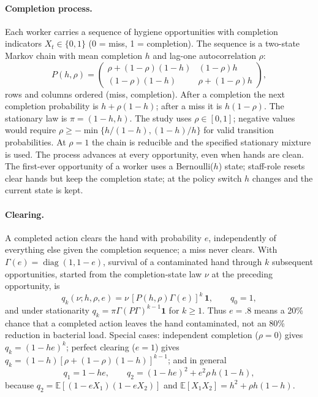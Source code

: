 \documentclass[11pt]{article}
\newcommand{\E}{\mathbb E}
\begin{document}
\paragraph{Completion process.} Each worker carries a sequence of hygiene
opportunities with completion indicators $X_t\in\{0,1\}$ (0 = miss, 1 =
completion). The sequence is a two-state Markov chain with mean completion $h$
and lag-one autocorrelation $\rho$:
\begin{equation}\label{eq:P}
P(h,\rho)=\begin{pmatrix}
\rho+(1-\rho)(1-h)&(1-\rho)h\\
(1-\rho)(1-h)&\rho+(1-\rho)h
\end{pmatrix},
\end{equation}
rows and columns ordered (miss, completion). After a completion the next
completion probability is $h+\rho(1-h)$; after a miss it is $h(1-\rho)$. The
stationary law is $\pi=(1-h,h)$. The study uses $\rho\in[0,1]$; negative values
would require $\rho\ge-\min\{h/(1-h),(1-h)/h\}$ for valid transition
probabilities. At $\rho=1$ the chain is reducible and the specified stationary
mixture is used. The process advances at every opportunity, even when hands are
clean. The first-ever opportunity of a worker uses a Bernoulli($h$) state;
staff-role resets clear hands but keep the completion state; at the policy
switch $h$ changes and the current state is kept.

\paragraph{Clearing.} A completed action clears the hand with probability $e$,
independently of everything else given the completion sequence; a miss never
clears. With $\Gamma(e)=\operatorname{diag}(1,1-e)$, survival of a contaminated hand
through $k$ subsequent opportunities, started from the completion-state law
$\nu$ at the preceding opportunity, is
\begin{equation}\label{eq:qk}
q_k(\nu;h,\rho,e)=\nu\,[P(h,\rho)\Gamma(e)]^k\,\boldsymbol 1,\qquad q_0=1,
\end{equation}
and under stationarity $q_k=\pi \Gamma(P\Gamma)^{k-1}\boldsymbol 1$ for $k\ge1$. Thus
$e=.8$ means a 20\% chance that a completed action leaves the hand contaminated,
not an 80\% reduction in bacterial load. Special cases: independent completion
($\rho=0$) gives $q_k=(1-he)^k$; perfect clearing ($e=1$) gives
$q_k=(1-h)[\rho+(1-\rho)(1-h)]^{k-1}$; and in general
\begin{equation}\label{eq:q12}
q_1=1-he,\qquad q_2=(1-he)^2+e^2\rho\,h(1-h),
\end{equation}
because $q_2=\E[(1-eX_1)(1-eX_2)]$ and $\E[X_1X_2]=h^2+\rho h(1-h)$.
\end{document}
